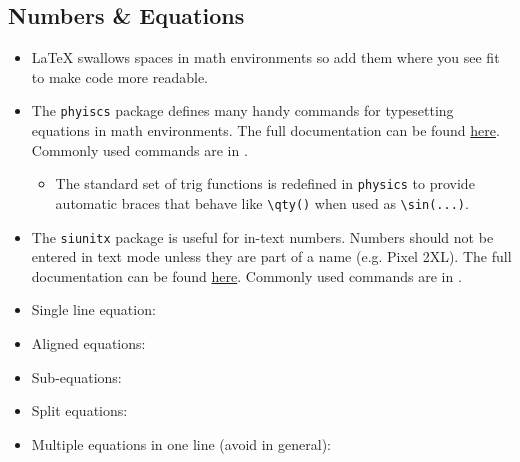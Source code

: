 \subsection{Numbers \& Equations}
\begin{itemize}
    \item \LaTeX{} swallows spaces in math environments so add them where you see fit to make code more readable.
    \item The \verb|phyiscs| package defines many handy commands for typesetting equations in math environments. The full documentation can be found \href{https://ctan.org/pkg/physics?lang=en}{here}. Commonly used commands are in .
    \begin{itemize}
        \item The standard set of trig functions is redefined in \verb|physics| to provide automatic braces that behave like \verb|\qty()| when used as \verb|\sin(...)|. 
    \end{itemize}
    \item The \verb|siunitx| package is useful for in-text numbers. Numbers should not be entered in text mode unless they are part of a name (e.g. Pixel 2XL). The full documentation can be found \href{https://ctan.org/pkg/siunitx?lang=en}{here}. Commonly used commands are in .
    \item Single line equation: 
    \item Aligned equations: 
    \item Sub-equations: 
    \item Split equations: 
    \item Multiple equations in one line (avoid in general): 
\end{itemize}
% 
